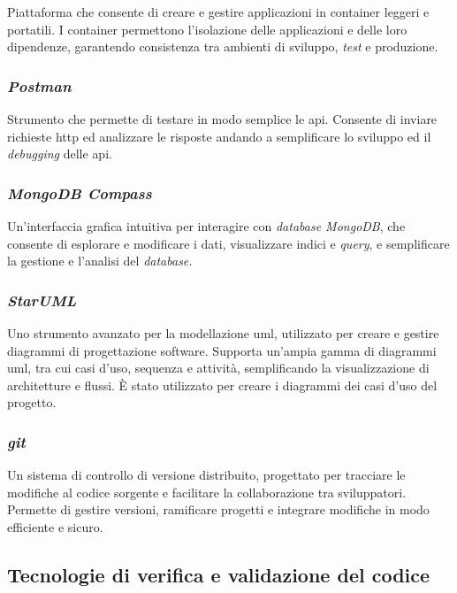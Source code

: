Piattaforma che consente di creare e gestire applicazioni in \gls{container} leggeri e portatili.
I \gls{container} permettono l’isolazione delle applicazioni e delle loro dipendenze, garantendo consistenza tra ambienti di sviluppo, \textit{test} e produzione.

\subsubsection{\textit{Postman}}

Strumento che permette di testare in modo semplice le \gls{api}. 
Consente di inviare richieste \gls{http} ed analizzare le risposte andando a semplificare lo sviluppo ed il \textit{debugging} delle \gls{api}.

\subsubsection{\textit{MongoDB Compass}}

Un'interfaccia grafica intuitiva per interagire con \textit{database MongoDB}, che consente di esplorare e modificare i dati, visualizzare indici e \textit{query},
e semplificare la gestione e l'analisi del \textit{database.}

\subsubsection{\textit{StarUML}}

Uno strumento avanzato per la modellazione \gls{uml}, utilizzato per creare e gestire diagrammi di progettazione software. Supporta un'ampia gamma di diagrammi \gls{uml}, tra cui casi d'uso, sequenza e attività, semplificando la visualizzazione di architetture e flussi.
È stato utilizzato per creare i diagrammi dei casi d’uso del progetto.


\subsubsection{\textit{git}}

Un sistema di controllo di versione distribuito, progettato per tracciare le modifiche al codice sorgente e facilitare la collaborazione tra sviluppatori. \\
Permette di gestire versioni, ramificare progetti e integrare modifiche in modo efficiente e sicuro. 

\subsection{Tecnologie di verifica e validazione del codice}
\label{sez:tecnologie-validazione-codice}

